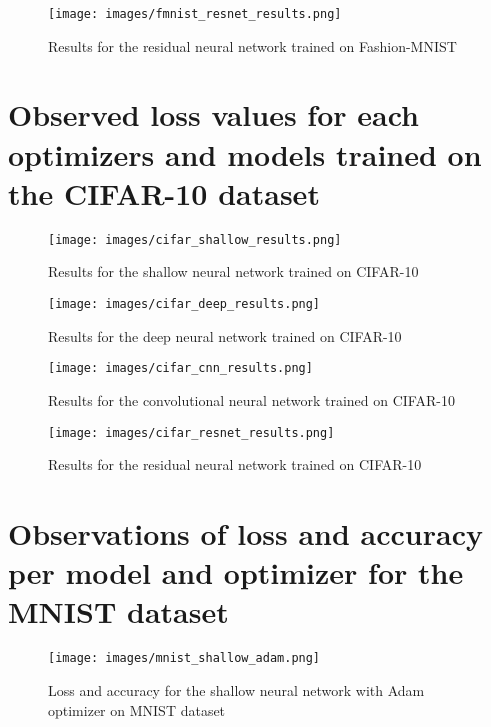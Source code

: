 \documentclass{article} %
\begin{document}
\begin{figure}[h]
\begin{center}
\texttt{[image: images/fmnist\_resnet\_results.png]}
\end{center}
\caption{Results for the residual neural network trained on Fashion-MNIST}
\end{figure}

\clearpage
\section{Observed loss values for each optimizers and models trained on the CIFAR-10 dataset}

\begin{figure}[h]
\begin{center}
\texttt{[image: images/cifar\_shallow\_results.png]}
\end{center}
\caption{Results for the shallow neural network trained on CIFAR-10}
\end{figure}

\begin{figure}[h]
\begin{center}
\texttt{[image: images/cifar\_deep\_results.png]}
\end{center}
\caption{Results for the deep neural network trained on CIFAR-10}
\end{figure}

\begin{figure}[h]
\begin{center}
\texttt{[image: images/cifar\_cnn\_results.png]}
\end{center}
\caption{Results for the convolutional neural network trained on CIFAR-10}
\end{figure}

\begin{figure}[h]
\begin{center}
\texttt{[image: images/cifar\_resnet\_results.png]}
\end{center}
\caption{Results for the residual neural network trained on CIFAR-10}
\end{figure}

\clearpage
\section{Observations of loss and accuracy per model and optimizer for the MNIST dataset}

\begin{figure}[h]
\begin{center}
\texttt{[image: images/mnist\_shallow\_adam.png]}
\end{center}
\caption{Loss and accuracy for the shallow neural network with Adam optimizer on MNIST dataset}
\end{figure}
\end{document}
